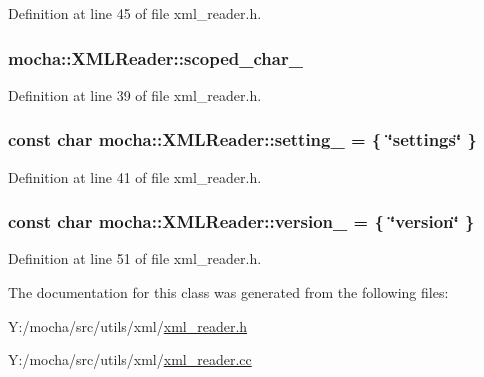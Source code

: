 Definition at line 45 of file xml\_\-reader.h.

\hypertarget{classmocha_1_1_x_m_l_reader_a0d0d4ff33f378d6c61a18bf6e6a45b06}{
\subsubsection[{scoped\_\-char\_\-}]{ {\bf mocha::XMLReader::scoped\_\-char\_\-}}}
\label{classmocha_1_1_x_m_l_reader_a0d0d4ff33f378d6c61a18bf6e6a45b06}


Definition at line 39 of file xml\_\-reader.h.

\hypertarget{classmocha_1_1_x_m_l_reader_aaf5e2fc0d87c47b98cc6f8db550d5af9}{
\subsubsection[{setting\_\-}]{\setlength{\rightskip}{0pt plus 5cm}const char {\bf mocha::XMLReader::setting\_\-} = \{ \char`\"{}settings\char`\"{} \}}}
\label{classmocha_1_1_x_m_l_reader_aaf5e2fc0d87c47b98cc6f8db550d5af9}


Definition at line 41 of file xml\_\-reader.h.

\hypertarget{classmocha_1_1_x_m_l_reader_a8a90655c87ea52747d0da94c3e992b6d}{
\subsubsection[{version\_\-}]{\setlength{\rightskip}{0pt plus 5cm}const char {\bf mocha::XMLReader::version\_\-} = \{ \char`\"{}version\char`\"{} \}}}
\label{classmocha_1_1_x_m_l_reader_a8a90655c87ea52747d0da94c3e992b6d}


Definition at line 51 of file xml\_\-reader.h.



The documentation for this class was generated from the following files:\begin{DoxyCompactItemize}
\item 
Y:/mocha/src/utils/xml/\hyperlink{xml__reader_8h}{xml\_\-reader.h}\item 
Y:/mocha/src/utils/xml/\hyperlink{xml__reader_8cc}{xml\_\-reader.cc}\end{DoxyCompactItemize}
